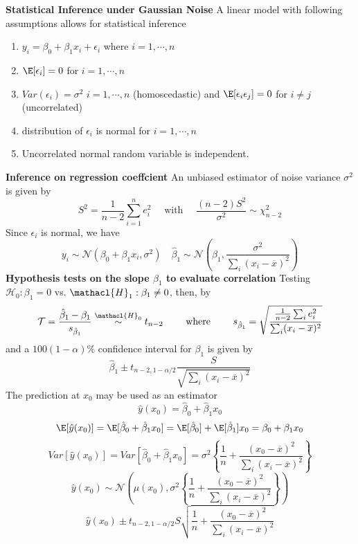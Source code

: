 \documentclass[8pt]{article}
\begin{document}
\begin{multicols}{3}
{    \textbf{Statistical Inference under Gaussian Noise} A linear model with following assumptions allows for statistical inference
    \begin{enumerate}
      \item $y_i = \beta_0 + \beta_1 x_i + \epsilon_i$ where $i = 1, \cdots, n$
      \item $\E[\epsilon_i] = 0$ for $i = 1,\cdots,n$
      \item $Var(\epsilon_i) = \sigma^2$ $i = 1,\cdots, n$ (homoscedastic) and $\E[\epsilon_i \epsilon_j] = 0$ for $i\neq j$ (uncorrelated)
      \item distribution of $\epsilon_i$  is normal for $i = 1,\cdots,n$
      \item Uncorrelated normal random variable is independent.
    \end{enumerate}
    \textbf{Inference on regression coeffcient} An unbiased estimator of noise variance $\sigma^2$ is given by
    \[
      S^2 = \frac{1}{n - 2} \sum_{i=1}^n e_i^2  \quad \text{ with } \quad \frac{(n-2)S^2}{\sigma^2} \sim \chi_{n-2}^2
    \]
    Since $\epsilon_i$ is normal, we have
    \[
      y_i \sim \mathcal{N}(\beta_0 + \beta_1 x_i, \sigma^2) \quad \hat{\beta}_1 \sim \mathcal{N}(\beta_1, \frac{\sigma^2}{\sum_i (x_i - \overline{x})^2})
    \]
    \textbf{Hypothesis tests on the slope $\beta_1$ to evaluate correlation} Testing $\mathcal{H}_0: \beta_1 = 0$ vs. $\mathacl{H}_1: \beta_1 \neq 0$, then, by
    \[
      \mathcal{T} =
      \frac{\hat{\beta}_1 - \beta_1}{s_{\hat{\beta}_1}} \stackrel{\mathacl{H}_0}{\sim} t_{n-2} \quad\quad \text{ where }\quad\quad s_{\hat{\beta}_1} = \sqrt{\frac{\frac{1}{n-2} \sum_i e_i^2}{\sum_i (x_i - \overline{x})^2}}
    \]
    and a $100(1-\alpha)\%$ confidence interval for $\beta_1$ is given by
    \[
      \hat{\beta}_1 \pm t_{n-2, 1 - \alpha/2} \frac{S}{\sqrt{\sum_i (x_i - \overline{x})^2 }}
    \]
    The prediction at $x_0$ may be used as an estimator
    \[
      \hat{y}(x_0) = \hat{\beta}_0 + \hat{\beta}_1 x_0
    \]
    \[
      \E[\hat{y}(x_0)] = \E[\hat{\beta}_0 + \hat{\beta}_1 x_0] = \E[\hat{\beta}_0] + \E[\hat{\beta}_1] x_0 = \beta_0 + \beta_1 x_0
    \]
    \[
      Var[\hat{y}(x_0)] = Var[\hat{\beta}_0 + \hat{\beta}_1 x_0] = \sigma^2 \left\{ \frac{1}{n} + \frac{(x_0 - \overline{x})^2}{\sum_i (x_i - \overline{x})^2}  \right\}
    \]
    \[
      \hat{y}(x_0) \sim \mathcal{N} \left( \mu(x_0), \sigma^2 \left\{ \frac{1}{n} + \frac{(x_0 - \overline{x})^2}{\sum_i (x_i - \overline{x})^2}  \right\}  \right)
    \]
    \[
      \hat{y}(x_0) \pm t_{n-2, 1-\alpha/2} S \sqrt{ \frac{1}{n} + \frac{(x_0 - \overline{x})^2}{\sum_i (x_i - \overline{x})^2} }
\]}
\end{multicols}
\end{document}
